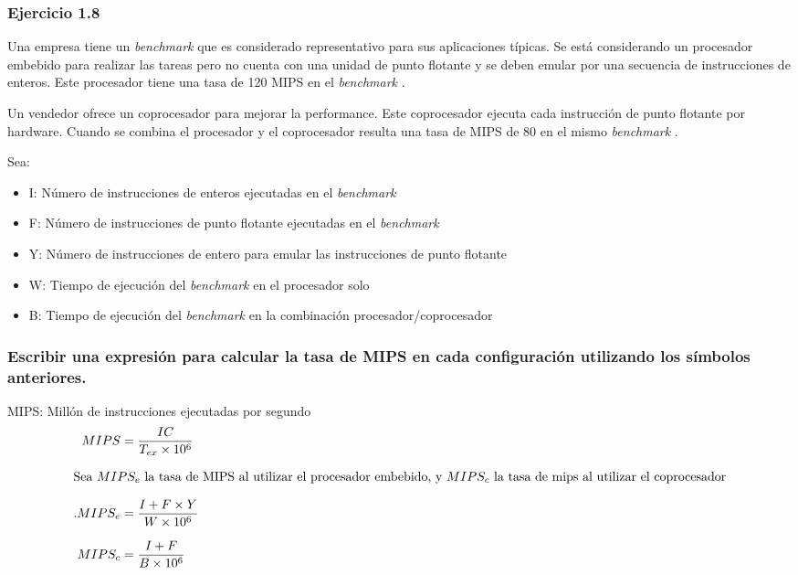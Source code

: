 \documentclass{beamer}
\newcommand{\BMRK}{\textit{benchmark }}
\begin{document}
\beamertemplatenavigationsymbolsempty
\begin{frame}
\frametitle{Ejercicio 1.8}

\begin{footnotesize}
Una empresa tiene un \BMRK que es considerado representativo para sus aplicaciones típicas. 
Se está considerando un procesador embebido para realizar las tareas pero no cuenta con una unidad de punto flotante y 
se deben emular por una secuencia de instrucciones de enteros. Este procesador tiene una tasa de 120 MIPS en el \BMRK.

Un vendedor ofrece un coprocesador para mejorar la performance. Este coprocesador ejecuta cada instrucción de punto 
flotante por hardware. Cuando se combina el procesador y el coprocesador resulta una tasa de MIPS de 80 en el mismo \BMRK.

Sea:
\begin{itemize}
 \item I: Número de instrucciones de enteros ejecutadas en el \BMRK
 \item F: Número de instrucciones de punto flotante ejecutadas en el \BMRK
 \item Y: Número de instrucciones de entero para emular las instrucciones de punto flotante
 \item W: Tiempo de ejecución del \BMRK en el procesador solo
 \item B: Tiempo de ejecución del \BMRK en la combinación procesador/coprocesador
\end{itemize}
\end{footnotesize}
\end{frame}

\begin{frame}
\frametitle{ 
Escribir una expresión para calcular la tasa de MIPS en cada configuración utilizando los símbolos anteriores.
}

MIPS: Millón  de instrucciones ejecutadas por segundo \\
\medskip
\begin{equation}\label{eqA}
\setlength{\jot}{10pt}
\begin{split}
MIPS &= \frac{IC}{T_{ex} \times 10^{6}} \\
\intertext{Sea $MIPS_{e}$ la tasa de MIPS al utilizar el procesador embebido, y $MIPS_{c}$ la tasa de mips al utilizar
el coprocesador}.
MIPS_{e} &= \frac{I + F \times Y}{W \times 10^6} \\
MIPS_{c} &= \frac{I + F}{B \times 10^6}
\end{split}
\end{equation}
\end{frame}
\end{document}

